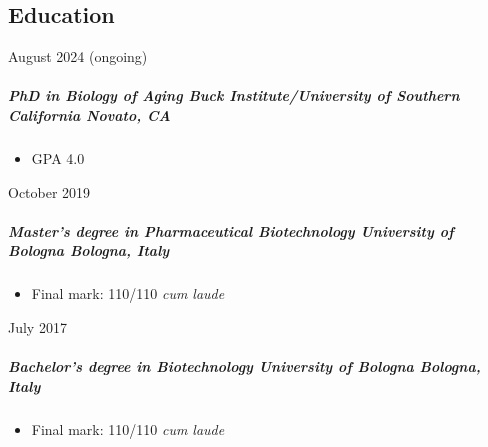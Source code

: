 \documentclass[
  letterpaper,
  DIV=11,
  numbers=noendperiod]{scrartcl}
\let\oldsubparagraph\subparagraph
\renewcommand{\subparagraph}[1]{\oldsubparagraph{#1}\mbox{}}
\providecommand{\tightlist}{%
  \setlength{\itemsep}{0pt}\setlength{\parskip}{0pt}}\usepackage{longtable,booktabs,array}
\begin{document}
\hypertarget{education}{%
\subsection{Education}\label{education}}

August 2024 (ongoing)

\hypertarget{phd-in-biology-of-aging-buck-instituteuniversity-of-southern-california-novato-ca}{%
\subparagraph{\texorpdfstring{\textbf{PhD in Biology of Aging \textbar{}
Buck Institute/University of Southern California \textbar{} Novato,
CA}}{PhD in Biology of Aging \textbar{} Buck Institute/University of Southern California \textbar{} Novato, CA}}\label{phd-in-biology-of-aging-buck-instituteuniversity-of-southern-california-novato-ca}}

\begin{itemize}
\tightlist
\item
  GPA 4.0
\end{itemize}

October 2019

\hypertarget{masters-degree-in-pharmaceutical-biotechnology-university-of-bologna-bologna-italy}{%
\subparagraph{\texorpdfstring{\textbf{Master's degree in Pharmaceutical
Biotechnology \textbar{} University of Bologna \textbar{} Bologna,
Italy}}{Master's degree in Pharmaceutical Biotechnology \textbar{} University of Bologna \textbar{} Bologna, Italy}}\label{masters-degree-in-pharmaceutical-biotechnology-university-of-bologna-bologna-italy}}

\begin{itemize}
\tightlist
\item
  Final mark: 110/110 \emph{cum laude}
\end{itemize}

July 2017

\hypertarget{bachelors-degree-in-biotechnology-university-of-bologna-bologna-italy}{%
\subparagraph{\texorpdfstring{\textbf{Bachelor's degree in Biotechnology
\textbar{} University of Bologna \textbar{} Bologna,
Italy}}{Bachelor's degree in Biotechnology \textbar{} University of Bologna \textbar{} Bologna, Italy}}\label{bachelors-degree-in-biotechnology-university-of-bologna-bologna-italy}}

\begin{itemize}
\tightlist
\item
  Final mark: 110/110 \emph{cum laude}
\end{itemize}
\end{document}
